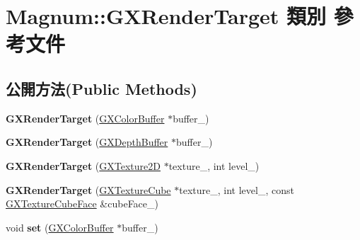 \hypertarget{class_magnum_1_1_g_x_render_target}{}\section{Magnum\+:\+:G\+X\+Render\+Target 類別 參考文件}
\label{class_magnum_1_1_g_x_render_target}
\subsection*{公開方法(Public Methods)}
\begin{DoxyCompactItemize}
\item 
{\bfseries G\+X\+Render\+Target} (\hyperlink{class_magnum_1_1_g_x_color_buffer}{G\+X\+Color\+Buffer} $\ast$buffer\+\_\+)\hypertarget{class_magnum_1_1_g_x_render_target_a987d8275d3382377e98b3dc45632eaa8}{}\label{class_magnum_1_1_g_x_render_target_a987d8275d3382377e98b3dc45632eaa8}

\item 
{\bfseries G\+X\+Render\+Target} (\hyperlink{class_magnum_1_1_g_x_depth_buffer}{G\+X\+Depth\+Buffer} $\ast$buffer\+\_\+)\hypertarget{class_magnum_1_1_g_x_render_target_aeb6b10397c079c42125330979111ce29}{}\label{class_magnum_1_1_g_x_render_target_aeb6b10397c079c42125330979111ce29}

\item 
{\bfseries G\+X\+Render\+Target} (\hyperlink{class_magnum_1_1_g_x_texture2_d}{G\+X\+Texture2D} $\ast$texture\+\_\+, int level\+\_\+)\hypertarget{class_magnum_1_1_g_x_render_target_a81059e26561e4009e7d558333725c802}{}\label{class_magnum_1_1_g_x_render_target_a81059e26561e4009e7d558333725c802}

\item 
{\bfseries G\+X\+Render\+Target} (\hyperlink{class_magnum_1_1_g_x_texture_cube}{G\+X\+Texture\+Cube} $\ast$texture\+\_\+, int level\+\_\+, const \hyperlink{class_magnum_1_1_g_x_texture_cube_face}{G\+X\+Texture\+Cube\+Face} \&cube\+Face\+\_\+)\hypertarget{class_magnum_1_1_g_x_render_target_aa783a7e9404ed18e2d71c77a7dd3a2dc}{}\label{class_magnum_1_1_g_x_render_target_aa783a7e9404ed18e2d71c77a7dd3a2dc}

\item 
void {\bfseries set} (\hyperlink{class_magnum_1_1_g_x_color_buffer}{G\+X\+Color\+Buffer} $\ast$buffer\+\_\+)\hypertarget{class_magnum_1_1_g_x_render_target_a30a2a71a26c2735c55a66debbefb4254}{}\label{class_magnum_1_1_g_x_render_target_a30a2a71a26c2735c55a66debbefb4254}


\end{DoxyCompactItemize}
